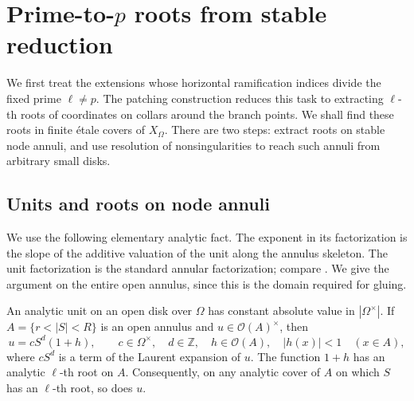 \section{Prime-to-\texorpdfstring{$p$}{p} roots from stable reduction}
\label{sec:tame-roots}

We first treat the extensions whose horizontal ramification indices divide
the fixed prime $\ell\ne p$.  The patching construction reduces this task to
extracting $\ell$-th roots of coordinates on collars around the branch
points.  We shall find these roots in finite \'etale covers of $X_\Omega$.
There are two steps: extract roots on stable node annuli, and use resolution
of nonsingularities to reach such annuli from arbitrary small disks.

\subsection{Units and roots on node annuli}

We use the following elementary analytic fact.  The exponent in its
factorization is the slope of the additive valuation of the unit along the
annulus skeleton.
The unit factorization is the standard annular factorization; compare
\cite[Proposition~2.2(1)]{BakerPayneRabinoff}.  We give the argument on
the entire open annulus, since this is the domain required for gluing.

\begin{lemma}\label{lem:annular-unit}
An analytic unit on an open disk over $\Omega$ has constant absolute value
in $|\Omega^\times|$.  If $A=\{r<|S|<R\}$ is an open annulus and
$u\in\mathcal O(A)^\times$, then
\[
 u=cS^d(1+h),\qquad c\in\Omega^\times,\quad d\in\mathbb Z,\quad
 h\in\mathcal O(A),\quad |h(x)|<1\quad(x\in A),
\]
where $cS^d$ is a term of the Laurent expansion of $u$.
The function $1+h$ has an analytic $\ell$-th root on $A$.
Consequently, on any analytic cover of $A$ on which $S$ has an
$\ell$-th root, so does $u$.
\end{lemma}

